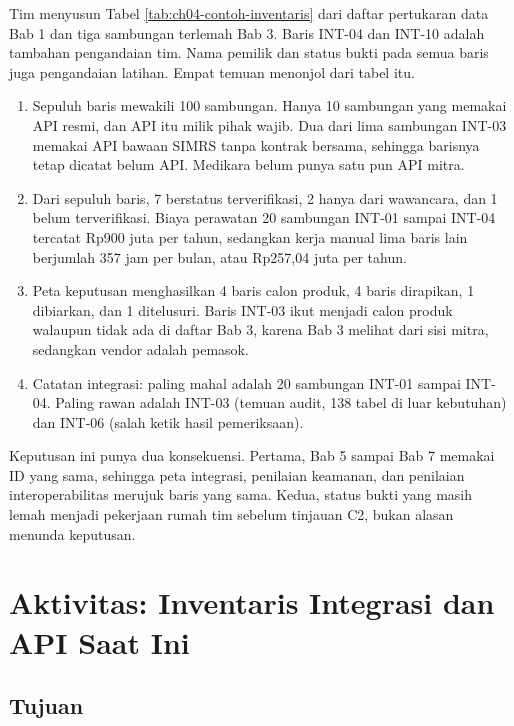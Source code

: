 \begin{kasus}[title={Kasus Medikara Health: Sepuluh Baris, Seratus Sambungan}]
Tim menyusun Tabel \ref{tab:ch04-contoh-inventaris} dari daftar pertukaran data Bab 1 dan tiga sambungan
terlemah Bab 3. Baris INT-04 dan INT-10 adalah tambahan pengandaian tim. Nama pemilik dan status bukti pada
semua baris juga pengandaian latihan. Empat temuan menonjol dari tabel itu.
\begin{enumerate}
  \item Sepuluh baris mewakili 100 sambungan. Hanya 10 sambungan yang memakai API resmi, dan API itu milik pihak
        wajib. Dua dari lima sambungan INT-03 memakai API bawaan SIMRS tanpa kontrak bersama, sehingga barisnya tetap dicatat
        belum API. Medikara belum punya satu pun API mitra.
  \item Dari sepuluh baris, 7 berstatus terverifikasi, 2 hanya dari wawancara, dan 1 belum terverifikasi.
        Biaya perawatan 20 sambungan INT-01 sampai INT-04 tercatat Rp900 juta per tahun, sedangkan kerja manual lima baris lain
        berjumlah 357 jam per bulan, atau Rp257,04 juta per tahun.
  \item Peta keputusan menghasilkan 4 baris calon produk, 4 baris dirapikan, 1 dibiarkan, dan 1 ditelusuri.
        Baris INT-03 ikut menjadi calon produk walaupun tidak ada di daftar Bab 3, karena Bab 3 melihat dari
        sisi mitra, sedangkan vendor adalah pemasok.
  \item Catatan integrasi: paling mahal adalah 20 sambungan INT-01 sampai INT-04. Paling rawan adalah INT-03
        (temuan audit, 138 tabel di luar kebutuhan) dan INT-06 (salah ketik hasil pemeriksaan).
\end{enumerate}

Keputusan ini punya dua konsekuensi. Pertama, Bab 5 sampai Bab 7 memakai ID yang sama, sehingga peta integrasi,
penilaian keamanan, dan penilaian interoperabilitas merujuk baris yang sama. Kedua, status bukti yang masih
lemah menjadi pekerjaan rumah tim sebelum tinjauan C2, bukan alasan menunda keputusan.
\end{kasus}

\section{Aktivitas: Inventaris Integrasi dan API Saat Ini}

\subsection*{Tujuan}


